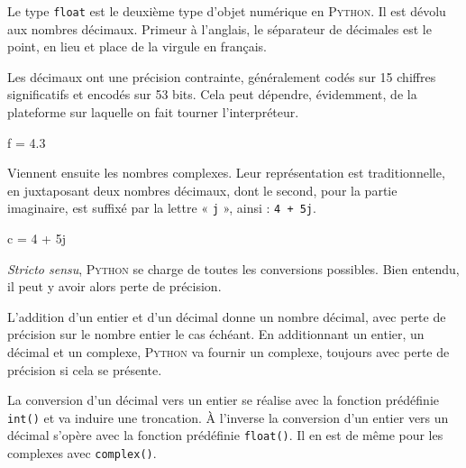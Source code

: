 \vspace{2pt}


Le type \texttt{float} est le deuxième type d'objet numérique en \textsc{Python}. Il est dévolu aux nombres décimaux. Primeur à l'anglais, le séparateur de décimales est le point, en lieu et place de la virgule en français.

Les décimaux ont une précision contrainte, généralement codés sur 15 chiffres significatifs et encodés sur 53 bits. Cela peut dépendre, évidemment, de la plateforme sur laquelle on fait tourner l'interpréteur.

\begin{idleconsole}
	\begin{pyconsole}
		f = 4.3
	\end{pyconsole}
\end{idleconsole}

\vspace{2pt}


Viennent ensuite les nombres complexes. Leur représentation est traditionnelle, en juxtaposant deux nombres décimaux, dont le second, pour la partie imaginaire, est suffixé par la lettre « \texttt{j} », ainsi : \texttt{4 + 5j}.

\begin{idleconsole}
	\begin{pyconsole}
		c = 4 + 5j
	\end{pyconsole}
\end{idleconsole}

\vspace{2pt}


\textit{Stricto sensu}, \textsc{Python} se charge de toutes les conversions possibles. Bien entendu, il peut y avoir alors perte de précision.

L'addition d'un entier et d'un décimal donne un nombre décimal, avec perte de précision sur le nombre entier le cas échéant. En additionnant un entier, un décimal et un complexe, \textsc{Python} va fournir un complexe, toujours avec perte de précision si cela se présente.

La conversion d'un décimal vers un entier se réalise avec la fonction prédéfinie \texttt{int()} et va induire une troncation. À l'inverse la conversion d'un entier vers un décimal s'opère avec la fonction prédéfinie \texttt{float()}. Il en est de même pour les complexes avec \texttt{complex()}.

